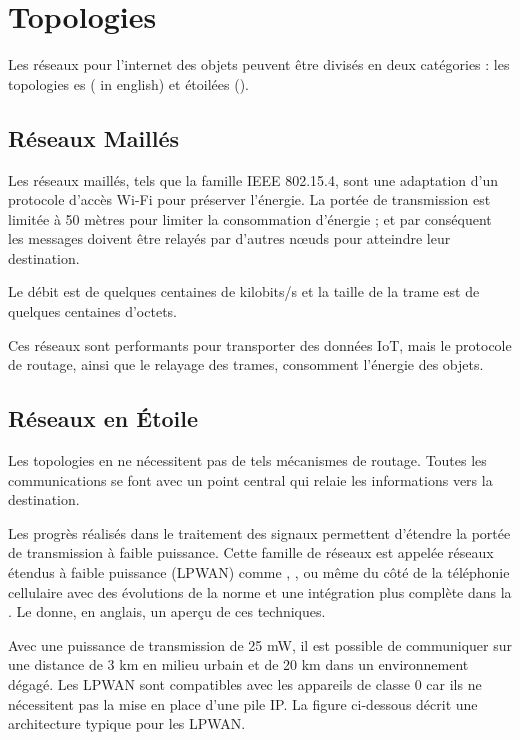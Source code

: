 \section{Topologies}

Les réseaux pour l’internet des objets peuvent être divisés en deux catégories : les topologies es ( in english) et étoilées ().


\subsection*{Réseaux Maillés}

Les réseaux maillés, tels que la famille IEEE 802.15.4,  sont une adaptation d’un protocole d’accès Wi-Fi pour préserver l’énergie. La portée de transmission est limitée à 50 mètres pour limiter la consommation d'énergie ; et par conséquent les messages doivent être relayés par d’autres nœuds pour atteindre leur destination.

Le débit est de quelques centaines de kilobits/s et la taille de la trame est de quelques centaines d’octets. 

Ces réseaux sont performants pour transporter des données IoT, mais le protocole de routage, ainsi que le relayage des trames, consomment l’énergie des objets.

\subsection*{Réseaux en Étoile}\label{chap-star}

Les topologies en  ne nécessitent pas de tels mécanismes de routage. Toutes les communications se font avec un point central qui relaie les informations vers la destination.

Les progrès réalisés dans le traitement des signaux permettent d’étendre la portée de transmission à faible puissance. Cette famille de réseaux est appelée réseaux étendus à faible puissance (\ac{LPWAN}) comme , , ou même du côté de la téléphonie cellulaire avec des évolutions de la norme  et une intégration plus complète dans la . Le  donne, en anglais, un aperçu de ces techniques.


    \vspace{1em}

Avec une puissance de transmission de 25 mW, il est possible de communiquer sur une distance de 3 km en milieu urbain et de 20 km dans un environnement dégagé. Les \ac{LPWAN} sont compatibles avec les appareils de classe 0 car ils ne nécessitent pas la mise en place d’une pile \ac{IP}. La figure ci-dessous décrit une architecture typique pour les \ac{LPWAN}.

